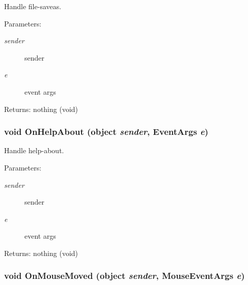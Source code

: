 Handle file-saveas. 

\begin{Desc}
\item[Parameters:]
\begin{description}
\item[{\em sender}]sender \item[{\em e}]event args \end{description}
\end{Desc}
\begin{Desc}
\item[Returns:]nothing (void) \end{Desc}
\subsubsection{\setlength{\rightskip}{0pt plus 5cm}void On\-Help\-About (object {\em sender}, Event\-Args {\em e})\hspace{0.3cm}{\tt  [private]}}\label{class_c_s_image_viewer_1_1_c_s_image_viewer_b79f98b6f80d0e13a447e3471d082862}


Handle help-about. 

\begin{Desc}
\item[Parameters:]
\begin{description}
\item[{\em sender}]sender \item[{\em e}]event args \end{description}
\end{Desc}
\begin{Desc}
\item[Returns:]nothing (void) \end{Desc}
\subsubsection{\setlength{\rightskip}{0pt plus 5cm}void On\-Mouse\-Moved (object {\em sender}, Mouse\-Event\-Args {\em e})\hspace{0.3cm}{\tt  [private]}}\label{class_c_s_image_viewer_1_1_c_s_image_viewer_9f3fb3c1482b02132c8435daac3daf6a}



